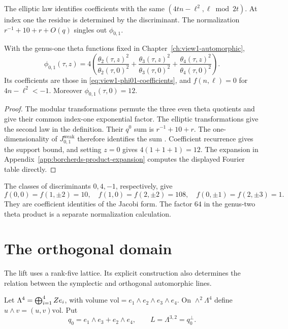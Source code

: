 The elliptic law identifies coefficients with the same
\((4tn-\ell^2,\ell\bmod2t)\).  At index one the residue is
determined by the discriminant.  The normalization
\(r^{-1}+10+r+O(q)\) singles out \(\phi_{0,1}\).

\begin{lemma}
\label{lem:phi01-presentations}
With the genus-one theta functions fixed in
Chapter~\ref{ch:view1-automorphic},
\[
 \phi_{0,1}(\tau,z)
 =4\left(
 \frac{\theta_2(\tau,z)^2}{\theta_2(\tau,0)^2}
 +\frac{\theta_3(\tau,z)^2}{\theta_3(\tau,0)^2}
 +\frac{\theta_4(\tau,z)^2}{\theta_4(\tau,0)^2}\right).
\]
Its coefficients are those in
\eqref{eq:view1-phi01-coefficients}, and
\(f(n,\ell)=0\) for \(4n-\ell^2<-1\).
Moreover \(\phi_{0,1}(\tau,0)=12\).
\end{lemma}

\begin{proof}
The modular transformations permute the three even theta quotients
and give their common index-one exponential factor.
The elliptic transformations give the second law in the definition.
Their \(q^0\) sum is \(r^{-1}+10+r\).
The one-dimensionality of \(J_{0,1}^{\mathrm{weak}}\) therefore
identifies the sum \cite{EZ:1}.
Coefficient recurrence gives the support bound, and setting \(z=0\)
gives \(4(1+1+1)=12\).
The expansion in Appendix~\ref{app:borcherds-product-expansion}
computes the displayed Fourier table directly.
\end{proof}

The classes of discriminants \(0,4,-1\), respectively, give
\[
 f(0,0)=f(1,\pm2)=10,\quad
 f(1,0)=f(2,\pm2)=108,\quad
 f(0,\pm1)=f(2,\pm3)=1.
\]
They are coefficient identities of the Jacobi form.
The factor \(64\) in the genus-two theta product is a separate
normalization calculation.

\section{The orthogonal domain}
\label{ssec:lattice-3-2}

The lift uses a rank-five lattice.  Its explicit construction also
determines the relation between the symplectic and orthogonal
automorphic lines.

\begin{definition}
\label{def:lambda-3-2}
Let \(\Lambda^4=\bigoplus_{i=1}^4Z e_i\), with volume
\(\mathrm{vol}=e_1\wedge e_2\wedge e_3\wedge e_4\).
On \(\wedge^2\Lambda^4\) define
\(u\wedge v=(u,v)\mathrm{vol}\).
Put
\[
 q_0=e_1\wedge e_3+e_2\wedge e_4,\qquad
 L=\Lambda^{3,2}=q_0^\perp.
\]
\end{definition}

